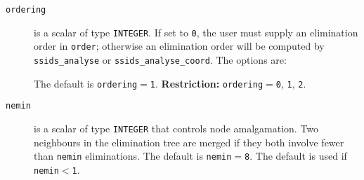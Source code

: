 \documentclass{spral}
\begin{document}
\begin{description}

\item[\texttt{ordering}] is a scalar of
type  {\tt INTEGER}. If set to {\tt 0}, the user
must supply an elimination order in {\tt order}; otherwise
an elimination order will be computed by {\tt ssids\_analyse}
or {\tt ssids\_analyse\_coord}.
The options are:
The default is {\tt ordering}$=${\tt 1}.
{\bf Restriction:} {\tt ordering}$=${\tt 0}, {\tt 1}, {\tt 2}.

\item[\texttt{nemin}] is a scalar of type  {\tt INTEGER} that controls
node amalgamation. Two neighbours in the elimination tree are merged
if they both involve fewer than {\tt nemin} eliminations.
The default is {\tt nemin$=$8}.
The default is used if {\tt nemin$<$1}.
\end{description}
\end{document}
